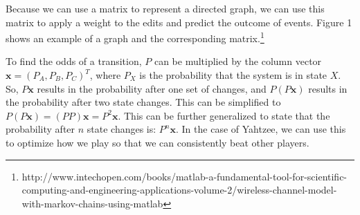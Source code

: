 Because we can use a matrix to represent a directed graph, we can use this matrix
to apply a weight to the edits and predict the outcome of events. Figure 1
shows an example of a graph and the corresponding matrix.\footnote{http://www.intechopen.com/books/matlab-a-fundamental-tool-for-scientific-computing-and-engineering-applications-volume-2/wireless-channel-model-with-markov-chains-using-matlab}

To find the odds of a transition, $P$ can be multiplied by the column vector
$\mathbf{x}=({P_A, P_B, P_C})^T$, where $P_X$ is the probability that the system
is in state $X$. So, $P\mathbf{x}$ results in the probability after one set
of changes, and $P(P\mathbf{x})$ results in the probability after two state
changes. This can be simplified to $P(P\mathbf{x}) = (PP)\mathbf{x} = P^2\mathbf{x}$.
This can be further generalized to state that the probability after $n$ state
changes is: $P^n\mathbf{x}$. In the case of Yahtzee, we can use this to optimize
how we play so that we can consistently beat other players.
